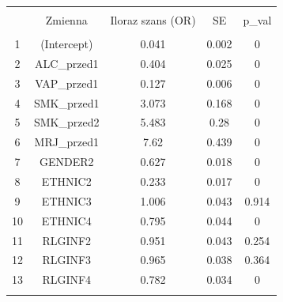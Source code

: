 
\begin{tabular}{@{\extracolsep{5pt}} ccccc} 
\\[-1.8ex]\hline 
\hline \\[-1.8ex] 
 & Zmienna & Iloraz szans (OR) & SE & p\_val \\ 
\hline \\[-1.8ex] 
1 & (Intercept) & 0.041 & 0.002 & 0 \\ 
2 & ALC\_przed1 & 0.404 & 0.025 & 0 \\ 
3 & VAP\_przed1 & 0.127 & 0.006 & 0 \\ 
4 & SMK\_przed1 & 3.073 & 0.168 & 0 \\ 
5 & SMK\_przed2 & 5.483 & 0.28 & 0 \\ 
6 & MRJ\_przed1 & 7.62 & 0.439 & 0 \\ 
7 & GENDER2 & 0.627 & 0.018 & 0 \\ 
8 & ETHNIC2 & 0.233 & 0.017 & 0 \\ 
9 & ETHNIC3 & 1.006 & 0.043 & 0.914 \\ 
10 & ETHNIC4 & 0.795 & 0.044 & 0 \\ 
11 & RLGINF2 & 0.951 & 0.043 & 0.254 \\ 
12 & RLGINF3 & 0.965 & 0.038 & 0.364 \\ 
13 & RLGINF4 & 0.782 & 0.034 & 0 \\ 
\hline \\[-1.8ex] 
\end{tabular} 
